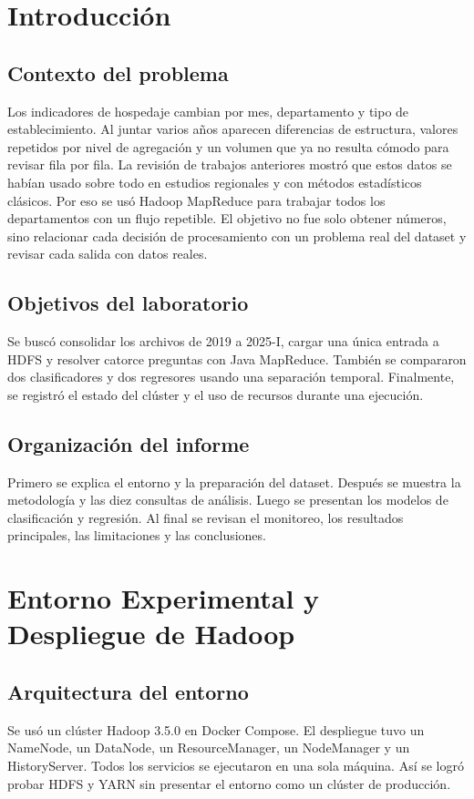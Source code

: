 \documentclass[10pt,a4paper]{article}
\theoremstyle{definition}
\begin{document}
\section{Introducción}
\subsection{Contexto del problema}
Los indicadores de hospedaje cambian por mes, departamento y tipo de
establecimiento. Al juntar varios años aparecen diferencias de estructura,
valores repetidos por nivel de agregación y un volumen que ya no resulta
cómodo para revisar fila por fila. La revisión de trabajos anteriores mostró
que estos datos se habían usado sobre todo en estudios regionales y con métodos
estadísticos clásicos. Por eso se usó Hadoop MapReduce para trabajar todos los
departamentos con un flujo repetible. El objetivo no fue solo obtener números,
sino relacionar cada decisión de procesamiento con un problema real del
dataset y revisar cada salida con datos reales.

\subsection{Objetivos del laboratorio}
Se buscó consolidar los archivos de 2019 a 2025-I, cargar una única entrada a
HDFS y resolver catorce preguntas con Java MapReduce. También se compararon dos
clasificadores y dos regresores usando una separación temporal. Finalmente, se
registró el estado del clúster y el uso de recursos durante una ejecución.

\subsection{Organización del informe}
Primero se explica el entorno y la preparación del dataset. Después se muestra
la metodología y las diez consultas de análisis. Luego se presentan los
modelos de clasificación y regresión. Al final se revisan el monitoreo, los
resultados principales, las limitaciones y las conclusiones.

\section{Entorno Experimental y Despliegue de Hadoop}
\subsection{Arquitectura del entorno}
Se usó un clúster Hadoop 3.5.0 en Docker Compose. El despliegue tuvo un
NameNode, un DataNode, un ResourceManager, un NodeManager y un HistoryServer.
Todos los servicios se ejecutaron en una sola máquina. Así se logró probar HDFS
y YARN sin presentar el entorno como un clúster de producción.
\end{document}
